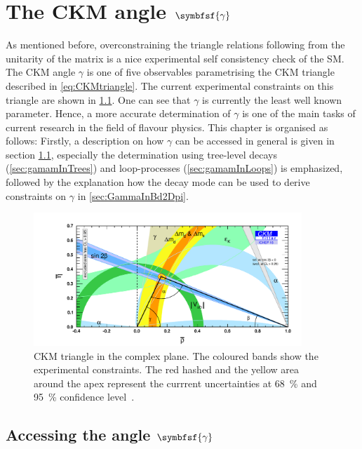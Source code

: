 \chapter[head={The CKM angle $\gamma$},tocentry={The CKM angle $\symbfsf{\gamma}$}]{The CKM angle $\symbfsf{\gamma}$}
\label{ch:CKMAngleGamma}

\linespread{1.08}\selectfont
As mentioned before, overconstraining the triangle relations following from the unitarity of the matrix is a nice experimental self consistency check of the \ac{SM}.
The CKM angle $\gamma$ is one of five observables parametrising the CKM triangle described in \cref{eq:CKMtriangle}.
The current experimental constraints on this triangle are shown in \cref{fig:ckmtriangle}.
One can see that $\gamma$ is currently the least well known parameter.
Hence, a more accurate determination of $\gamma$ is one of the main tasks of current research in the field of flavour physics.
This chapter is organised as follows: Firstly, a description on how $\gamma$ can be accessed in general is given in section \cref{sec:accessGamma}, especially the determination using tree-level decays (\cref{sec:gamamInTrees}) and loop-processes (\cref{sec:gamamInLoops}) is emphasized, followed by the explanation how the decay mode \BdToDpi can be used to derive constraints on $\gamma$ in \cref{sec:GammaInBd2Dpi}.

\begin{figure}[tbp]
	\centering
	\includegraphics[width=0.9\textwidth]{04gamma/figs/CKMTriangle.pdf}
	\caption{CKM triangle in the complex plane.
	The coloured bands show the experimental constraints.
	The red hashed and the yellow area around the apex represent the currrent uncertainties at \SI{68}{\percent} and \SI{95}{\percent} confidence level~\cite{CKMfitter2015}.}
	\label{fig:ckmtriangle}
\end{figure}

\section[head={Accessing the angle $\gamma$},tocentry={Accessing the angle $\gamma$}]{Accessing the angle $\symbfsf{\gamma}$}
\label{sec:accessGamma}



